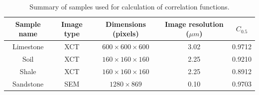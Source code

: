 \documentclass[reprint,amsmath,amssymb,aps,pre,showkeys,showpacs]{revtex4-1}
\begin{document}
\begin{table}[!htp]
  \centering
  \begin{tabular}{|c|c|c|c|c|}
    \hline
    Sample name & Image type & Dimensions (pixels) & Image resolution ($\mu m$) & $C_{0.5}$\\
    \hline
    Limestone & XCT &  $600 \times 600 \times 600$ & 3.02 & 0.9712 \\
    Soil & XCT & $160 \times 160 \times 160$ & 2.25 & 0.9210 \\
    Shale & XCT & $160 \times 160 \times 160$ & 2.25 & 0.8912 \\
    Sandstone & SEM &  $1280 \times 869$ & 0.10 & 0.9703 \\
    \hline
  \end{tabular}
  \caption{Summary of samples used for calculation of correlation functions.}
  \label{tab:summary}
\end{table}
\end{document}
